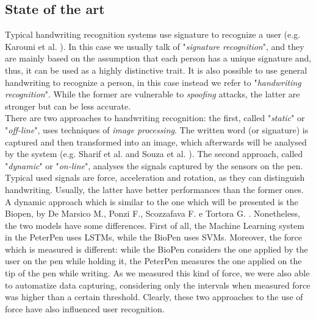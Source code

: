 \documentclass[8pt,notitlepage]{report}
\begin{document}
\subsection*{State of the art}
	Typical handwriting recognition systems use signature to recognize a user (e.g. Karouni et al. \cite{Karouni15}). In this case we usually talk of "\textit{signature recognition}", and they are mainly based on the assumption that each person has a unique signature and, thus, it can be used as a highly distinctive trait. It is also possible to use general handwriting to recognize a person, in this case instead we refer to "\textit{handwriting recognition}". While the former are vulnerable to \textit{spoofing} attacks, the latter are stronger but can be less accurate. \\ 
	There are two approaches to handwriting recognition: the first, called "\textit{static}" or "\textit{off-line}", uses techniques of \textit{image processing}. The written word (or signature) is captured and then transformed into an image, which afterwards will be analysed by the system (e.g. Sharif et al. \cite{Sharif18} and Souza et al. \cite{Souza18}). The second approach, called "\textit{dynamic}" or "\textit{on-line}", analyses the signals captured by the sensors on the pen. Typical used signals are force, acceleration and rotation, as they can distinguish handwriting. Usually, the latter have better performances than the former ones. \\
	A dynamic approach which is similar to the one which will be presented is the Biopen, by De Marsico M., Ponzi F., Scozzafava F. e Tortora G. \cite{DeMarsico18}. Nonetheless, the two models have some differences. First of all, the Machine Learning system in the PeterPen uses LSTMs, while the BioPen uses SVMs. Moreover, the force which is measured is different: while the BioPen considers the one applied by the user on the pen while holding it, the PeterPen measures the one applied on the tip of the pen while writing. As we measured this kind of force, we were also able to automatize data capturing, considering only the intervals when measured force was higher than a certain threshold. Clearly, these two approaches to the use of force have also influenced user recognition.
	
\end{document}
